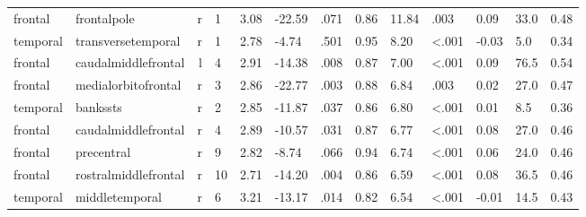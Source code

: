 \documentclass{article}
\begin{document}
\begin{longtable}{llrR{1.5cm}R{1cm}R{1.3cm}R{1cm}R{1cm}R{1.3cm}R{1cm}R{1.8cm}R{1.3cm}R{1.8cm}}
\bottomrule
\endlastfoot
   frontal &               frontalpole &    r &            1 &                  3.08 &           -22.59 &               .071 &                               0.86 &                         11.84 &                            .003 &  0.09 &   33.0 &      0.48 \\
  temporal &        transversetemporal &    r &            1 &                  2.78 &            -4.74 &               .501 &                               0.95 &                          8.20 &                   \textless.001 & -0.03 &    5.0 &      0.34 \\
   frontal &       caudalmiddlefrontal &    l &            4 &                  2.91 &           -14.38 &               .008 &                               0.87 &                          7.00 &                   \textless.001 &  0.09 &   76.5 &      0.54 \\
   frontal &       medialorbitofrontal &    r &            3 &                  2.86 &           -22.77 &               .003 &                               0.88 &                          6.84 &                            .003 &  0.02 &   27.0 &      0.47 \\
  temporal &                  bankssts &    r &            2 &                  2.85 &           -11.87 &               .037 &                               0.86 &                          6.80 &                   \textless.001 &  0.01 &    8.5 &      0.36 \\
   frontal &       caudalmiddlefrontal &    r &            4 &                  2.89 &           -10.57 &               .031 &                               0.87 &                          6.77 &                   \textless.001 &  0.08 &   27.0 &      0.46 \\
   frontal &                precentral &    r &            9 &                  2.82 &            -8.74 &               .066 &                               0.94 &                          6.74 &                   \textless.001 &  0.06 &   24.0 &      0.46 \\
   frontal &      rostralmiddlefrontal &    r &           10 &                  2.71 &           -14.20 &               .004 &                               0.86 &                          6.59 &                   \textless.001 &  0.08 &   36.5 &      0.46 \\
  temporal &            middletemporal &    r &            6 &                  3.21 &           -13.17 &               .014 &                               0.82 &                          6.54 &                   \textless.001 & -0.01 &   14.5 &      0.43 \\

\end{longtable}
\end{document}
